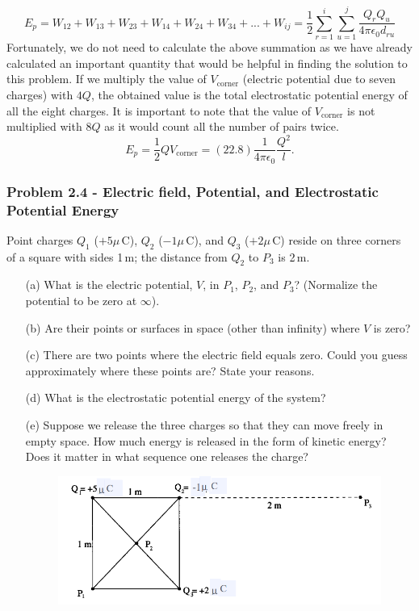 \documentclass{article}
\begin{document}
\[E_p=W_{12}+W_{13}+W_{23}+W_{14}+W_{24}+W_{34}+. . .+ W_{ij}=\frac{1}{2}\sum_{r=1}^{i}\sum_{u=1}^{j}\frac{Q_rQ_u}{4\pi\epsilon_0d_{ru}}\]
Fortunately, we do not need to calculate the above summation as we have already calculated an important quantity that would be helpful in finding the solution to this problem. If we multiply the value of $V_{\text{corner}}$ (electric potential due to seven charges) with $4Q$, the obtained value is the total electrostatic potential energy of all the eight charges. It is important to note that the value of $V_{\text{corner}}$ is not multiplied with $8Q$ as it would count all the number of pairs twice. 
\[E_p=\frac{1}{2}QV_{\text{corner}}=(22.8)\frac{1}{4\pi\epsilon_0}\frac{Q^2}{l}.\]

\subsubsection*{Problem 2.4 - Electric field, Potential, and Electrostatic Potential Energy}
Point charges $Q_1$ ($+5\mu$\,C), $Q_2$ ($-1\mu$\,C), and $Q_3$ ($+2\mu$\,C) reside on three corners of a square with sides 1\,m; the distance from $Q_2$ to $P_3$ is 2\,m.
\begin{enumerate}
    \item[(a)]What is the electric potential, $V$, in $P_1$, $P_2$, and $P_3$? (Normalize the potential to be zero at $\infty$).
    \item[(b)]Are their points or surfaces in space (other than infinity) where $V$ is zero? 
    \item[(c)]There are two points where the electric field equals zero. Could you guess approximately where these points are? State your reasons.
    \item[(d)]What is the electrostatic potential energy of the system?
    \item[(e)]Suppose we release the three charges so that they can move freely in empty space. How much energy is released in the form of kinetic energy? Does it matter in what sequence one releases the charge?
    \begin{figure}[h]
        \centering
        \includegraphics[width=0.7\linewidth]{figs/fig_prob_2.4.png}
    \end{figure}
\end{enumerate}
\end{document}
